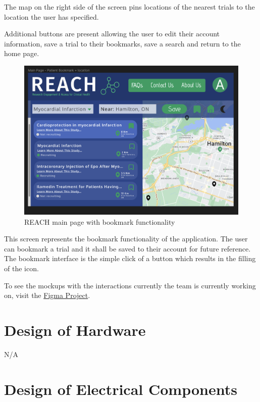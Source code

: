 \documentclass[12pt, titlepage]{article}
\begin{document}
 The map on the right side of
 the screen pins locations of the nearest trials to the location the user has specified. \newline
 
 Additional buttons are present allowing the user to edit their account information, 
 save a trial to their bookmarks, save a search and return to the home page. 

\begin{figure}[H]
  \centering
  \includegraphics[width=0.9\linewidth]{images/Bookmark.png}
  \caption{REACH main page with bookmark functionality}
  \label{fig:figure4}
\end{figure}

This screen represents the bookmark functionality of the application. 
The user can bookmark a trial and it shall be saved to their account for future reference. 
The bookmark interface is the simple click of a button which results in 
the filling of the icon. \newline


To see the mockups with the interactions currently
the team is currently working on, visit the \href{https://www.figma.com/file/58wCxZa5xulKIIYw8eX8Pr/REACH-Trial-Functionality?type=design&node-id=0%3A1&mode=design&t=ff0O5TWpZokg19Q8-1}{Figma Project}.


\section{Design of Hardware}

N/A

\section{Design of Electrical Components}
\end{document}
